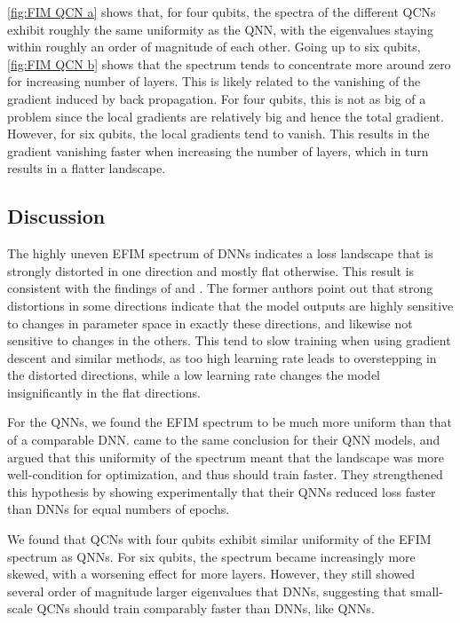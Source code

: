 \cref{fig:FIM QCN a} shows that, for four qubits, the spectra of the different QCNs exhibit roughly the same uniformity as the QNN, with the eigenvalues staying within roughly an order of magnitude of each other. Going up to six qubits, \cref{fig:FIM QCN b} shows that the spectrum tends to concentrate more around zero for increasing number of layers. This is likely related to the vanishing of the gradient induced by back propagation. For four qubits, this is not as big of a problem since the local gradients are relatively big and hence the total gradient. However, for six qubits, the local gradients tend to vanish. This results in the gradient vanishing faster when increasing the number of layers, which in turn results in a flatter landscape. 


\subsection{Discussion}\label{sec:Loss Landscape Discussion}
The highly uneven EFIM spectrum of DNNs indicates a loss landscape that is strongly distorted in one direction and mostly flat otherwise. This result is consistent with the findings of \citet{karakida2019universal} and \citet{abbas2020power}. The former authors point out that strong distortions in some directions indicate that the model outputs are highly sensitive to changes in parameter space in exactly these directions, and likewise not sensitive to changes in the others. This tend to slow training when using gradient descent and similar methods, as too high learning rate leads to overstepping in the distorted directions, while a low learning rate changes the model insignificantly in the flat directions. 

For the QNNs, we found the EFIM spectrum to be much more uniform than that of a comparable DNN. \citet{abbas2020power} came to the same conclusion for their QNN models, and argued that this uniformity of the spectrum meant that the landscape was more well-condition for optimization, and thus should train faster. They strengthened this hypothesis by showing experimentally that their QNNs reduced loss faster than DNNs for equal numbers of epochs. 

We found that QCNs with four qubits exhibit similar uniformity of the EFIM spectrum as QNNs. For six qubits, the spectrum became increasingly more skewed, with a worsening effect for more layers. However, they still showed several order of magnitude larger eigenvalues that DNNs, suggesting that small-scale QCNs should train comparably faster than DNNs, like QNNs.

